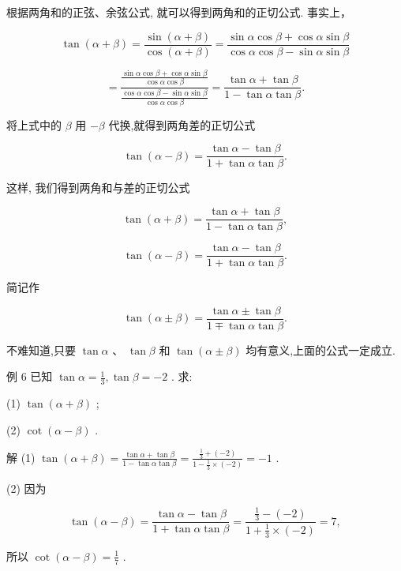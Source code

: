 \documentclass[10pt]{article}
\begin{document}
根据两角和的正弦、余弦公式, 就可以得到两角和的正切公式. 事实上，

\[
\tan \left( {\alpha  + \beta }\right)  = \frac{\sin \left( {\alpha  + \beta }\right) }{\cos \left( {\alpha  + \beta }\right) } = \frac{\sin \alpha \cos \beta  + \cos \alpha \sin \beta }{\cos \alpha \cos \beta  - \sin \alpha \sin \beta }
\]

\[
= \frac{\frac{\sin \alpha \cos \beta  + \cos \alpha \sin \beta }{\cos \alpha \cos \beta }}{\frac{\cos \alpha \cos \beta  - \sin \alpha \sin \beta }{\cos \alpha \cos \beta }} = \frac{\tan \alpha  + \tan \beta }{1 - \tan \alpha \tan \beta }.
\]

将上式中的 \(\beta\) 用 \(- \beta\) 代换,就得到两角差的正切公式

\[
\tan \left( {\alpha  - \beta }\right)  = \frac{\tan \alpha  - \tan \beta }{1 + \tan \alpha \tan \beta }.
\]

这样, 我们得到两角和与差的正切公式

\[
\tan \left( {\alpha  + \beta }\right)  = \frac{\tan \alpha  + \tan \beta }{1 - \tan \alpha \tan \beta },
\]

\[
\tan \left( {\alpha  - \beta }\right)  = \frac{\tan \alpha  - \tan \beta }{1 + \tan \alpha \tan \beta }.
\]

简记作

\[
\tan \left( {\alpha  \pm  \beta }\right)  = \frac{\tan \alpha  \pm  \tan \beta }{1 \mp  \tan \alpha \tan \beta }.
\]

不难知道,只要 \(\tan \alpha \text{ 、 }\tan \beta\) 和 \(\tan \left( {\alpha  \pm  \beta }\right)\) 均有意义,上面的公式一定成立.

例 6 已知 \(\tan \alpha  = \frac{1}{3},\tan \beta  =  - 2\) . 求:

(1) \(\tan \left( {\alpha  + \beta }\right)\) ;

(2) \(\cot \left( {\alpha  - \beta }\right)\) .

解 (1) \(\tan \left( {\alpha  + \beta }\right)  = \frac{\tan \alpha  + \tan \beta }{1 - \tan \alpha \tan \beta } = \frac{\frac{1}{3} + \left( {-2}\right) }{1 - \frac{1}{3} \times  \left( {-2}\right) } =  - 1\) .

(2) 因为

\[
\tan \left( {\alpha  - \beta }\right)  = \frac{\tan \alpha  - \tan \beta }{1 + \tan \alpha \tan \beta } = \frac{\frac{1}{3} - \left( {-2}\right) }{1 + \frac{1}{3} \times  \left( {-2}\right) } = 7,
\]

所以 \(\cot \left( {\alpha  - \beta }\right)  = \frac{1}{7}\) .
\end{document}
